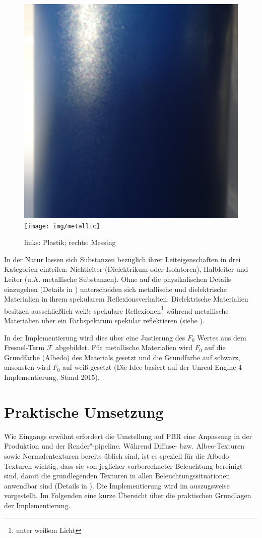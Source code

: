 \begin{figure}
	\label{fig:dielectric-metallic}
	\includegraphics[width=.5\textwidth]{img/dielectric}
	\texttt{[image: img/metallic]}
	\caption[Dielektische und metallische Materialien]{links: Plastik; rechts: Messing}
\end{figure}

In der Natur lassen sich Substanzen bezüglich ihrer Leiteigenschaften in drei Kategorien einteilen: Nichtleiter (Dielektrikum oder Isolatoren), Halbleiter und Leiter (u.A. metallische Substanzen). Ohne auf die physikalischen Details einzugehen (Details in \cite[Abschnitt: Glanz und Farbe der Metalle]{Zawischa2011}) unterscheiden sich metallische und dielektrische Materialien in ihrem spekularem Reflexionsverhalten. Dielektrische Materialien besitzen ausschließlich weiße spekulare Reflexionen\footnote{unter weißem Licht} während metallische Materialien über ein Farbspektrum spekular reflektieren \parencite[Abschnitt: Specular]{Lagarde2011a}(siehe ).

In der Implementierung wird dies über eine Justierung des $F_0$ Wertes aus dem Fresnel-Term $\mathcal{F}$ abgebildet. Für metallische Materialien wird $F_0$ auf die Grundfarbe (Albedo) des Materials gesetzt und die Grundfarbe auf schwarz, ansonsten wird $F_0$ auf weiß gesetzt (Die Idee basiert auf der Unreal Engine 4 Implementierung, Stand 2015).

\section{Praktische Umsetzung}
\label{sec:pbr-umsetzung}


Wie Eingangs erwähnt erfordert die Umstellung auf \ac{PBR} eine Anpassung in der Produktion und der Render"-pipeline. Während Diffuse- bzw. Albeo-Texturen sowie Normalentexturen bereits üblich sind, ist es speziell für die Albedo Texturen wichtig, dass sie von jeglicher vorberechneter Beleuchtung bereinigt sind, damit die grundlegenden Texturen in allen Beleuchtungssituationen anwendbar sind (Details in \cite{Lagarde2011}). Die Implementierung wird im  auszugsweise vorgestellt. Im Folgenden eine kurze Übersicht über die praktischen Grundlagen der Implementierung.

